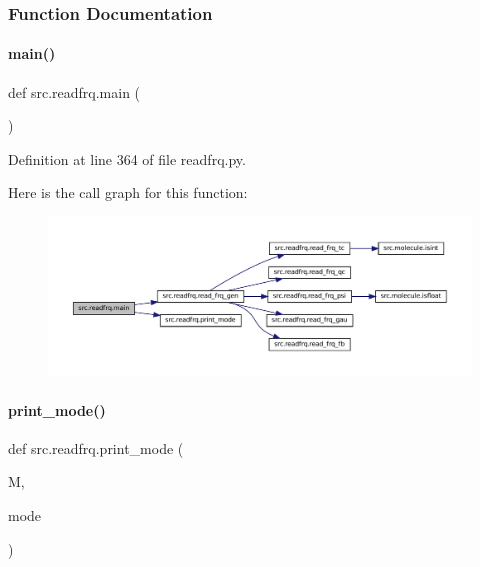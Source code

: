 \subsubsection{Function Documentation}
\mbox{\label{namespacesrc_1_1readfrq_acab07dc315e92f5dd2ee338248f72a49}} 
\paragraph{\texorpdfstring{main()}{main()}}
{\footnotesize\ttfamily def src.\+readfrq.\+main (\begin{DoxyParamCaption}{ }\end{DoxyParamCaption})}



Definition at line 364 of file readfrq.\+py.

Here is the call graph for this function\+:
\nopagebreak
\begin{figure}[H]
\begin{center}
\leavevmode
\includegraphics[width=350pt]{namespacesrc_1_1readfrq_acab07dc315e92f5dd2ee338248f72a49_cgraph}
\end{center}
\end{figure}
\mbox{\label{namespacesrc_1_1readfrq_aa63f27ca510452256ef35b8d7052966c}} 
\paragraph{\texorpdfstring{print\+\_\+mode()}{print\_mode()}}
{\footnotesize\ttfamily def src.\+readfrq.\+print\+\_\+mode (\begin{DoxyParamCaption}\item[{}]{M,  }\item[{}]{mode }\end{DoxyParamCaption})}



